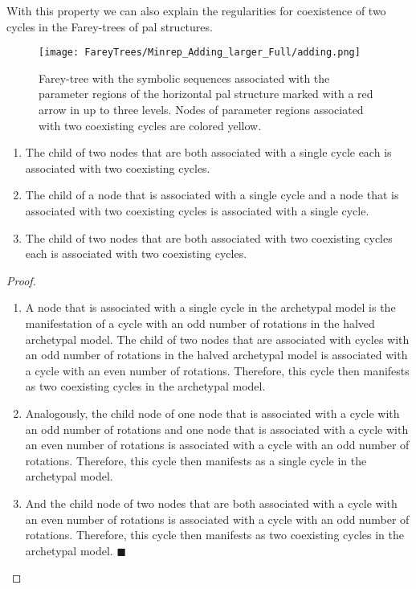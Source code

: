 With this property we can also explain the regularities for coexistence of two cycles in the Farey-trees of \gls{pal} structures.

\begin{figure}
	\centering
	\texttt{[image: FareyTrees/Minrep\_Adding\_larger\_Full/adding.png]}
	\caption[Farey-tree with the symbolic sequences of a horizontal  structure]{
		Farey-tree with the symbolic sequences associated with the parameter regions of the horizontal \gls{pal} structure marked with a red arrow in  up to three levels.
		Nodes of parameter regions associated with two coexisting cycles are colored yellow.
	}
	\label{fig:add.prop.hor.tree}
\end{figure}

\begin{theorem}
	\label{theorem:child.coexistence}
	\begin{enumerate}
		\item The child of two nodes that are both associated with a single cycle each is associated with two coexisting cycles.
		\item The child of a node that is associated with a single cycle and a node that is associated with two coexisting cycles is associated with a single cycle.
		\item The child of two nodes that are both associated with two coexisting cycles each is associated with two coexisting cycles.
	\end{enumerate}
\end{theorem}

\begin{proof} \phantom{x}
	\begin{enumerate}
		\item A node that is associated with a single cycle in the archetypal model is the manifestation of a cycle with an odd number of rotations in the halved archetypal model.
		      The child of two nodes that are associated with cycles with an odd number of rotations in the halved archetypal model is associated with a cycle with an even number of rotations.
		      Therefore, this cycle then manifests as two coexisting cycles in the archetypal model.
		\item Analogously, the child node of one node that is associated with a cycle with an odd number of rotations and one node that is associated with a cycle with an even number of rotations is associated with a cycle with an odd number of rotations.
		      Therefore, this cycle then manifests as a single cycle in the archetypal model.
		\item And the child node of two nodes that are both associated with a cycle with an even number of rotations is associated with a cycle with an odd number of rotations.
		      Therefore, this cycle then manifests as two coexisting cycles in the archetypal model.
		      \hfill $\blacksquare$ %
	\end{enumerate}
\end{proof}

